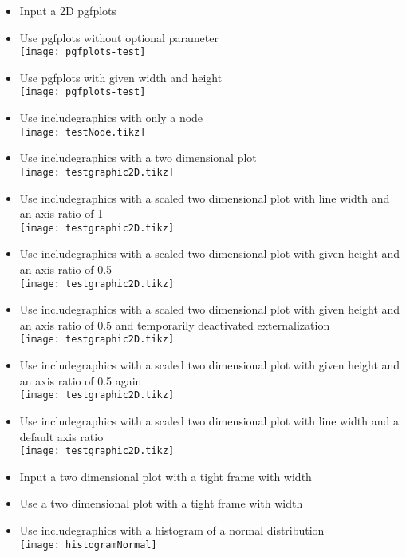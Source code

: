 \documentclass[twocolumn]{article}
\begin{document}
\begin{itemize}
		\item Input a 2D pgfplots\\
		\item Use pgfplots without optional parameter\\%
			\texttt{[image: pgfplots-test]}%
		\item Use pgfplots with given width and height\\%
			\texttt{[image: pgfplots-test]}%
		\item Use includegraphics with only a node\\%
			\texttt{[image: testNode.tikz]}%
		\item Use includegraphics with a two dimensional plot\\%
			\texttt{[image: testgraphic2D.tikz]}%
		\item Use includegraphics with a scaled two dimensional plot with line width and an axis ratio of 1\\%
			\texttt{[image: testgraphic2D.tikz]}%
		\item Use includegraphics with a scaled two dimensional plot with given height and an axis ratio of 0.5\\%
			\texttt{[image: testgraphic2D.tikz]}%
		\item Use includegraphics with a scaled two dimensional plot with given height and an axis ratio of 0.5 and temporarily deactivated externalization\\%
			\tikzexternaldisable
			\texttt{[image: testgraphic2D.tikz]}%
			\tikzexternalenable
		\item Use includegraphics with a scaled two dimensional plot with given height and an axis ratio of 0.5 again\\%
			\texttt{[image: testgraphic2D.tikz]}%
		\item Use includegraphics with a scaled two dimensional plot with line width and a default axis ratio\\%
			\texttt{[image: testgraphic2D.tikz]}%
		\item Input a two dimensional plot with a tight frame with width \newlength{\mylen}\settowidth{\mylen}{\frame{}}\the\mylen\\%
			\frame{}
		\item Use a two dimensional plot with a tight frame with width \the\mylen\\%
		\item Use includegraphics with a histogram of a normal distribution\\%
			\texttt{[image: histogramNormal]}%
	\end{itemize}
\end{document}
